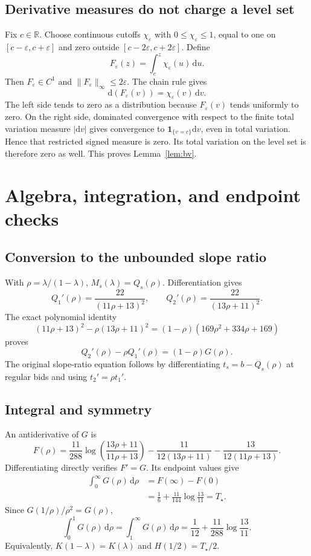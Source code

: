 \documentclass[11pt,a4paper]{article}
\numberwithin{equation}{section}
\theoremstyle{definition}
\theoremstyle{remark}
\newcommand{\R}{\mathbb R}
\newcommand{\dd}{\,\mathrm d}
\newcommand{\ind}{\mathbf 1}
\newcommand{\Ts}{T_\star}
\begin{document}
\subsection{Derivative measures do not charge a level set}
Fix $c\in\R$. Choose continuous cutoffs $\chi_\varepsilon$ with $0\le\chi_\varepsilon\le1$, equal to one on $[c-\varepsilon,c+\varepsilon]$ and zero outside $[c-2\varepsilon,c+2\varepsilon]$. Define
\[
 F_\varepsilon(z)=\int_c^z\chi_\varepsilon(u)\dd u.
\]
Then $F_\varepsilon\in C^1$ and $\|F_\varepsilon\|_\infty\le2\varepsilon$. The chain rule gives
\[
 \mathrm d(F_\varepsilon(v))=\chi_\varepsilon(v)\,\mathrm dv.
\]
The left side tends to zero as a distribution because $F_\varepsilon(v)$ tends uniformly to zero. On the right side, dominated convergence with respect to the finite total variation measure $|\mathrm dv|$ gives convergence to $\ind_{\{v=c\}}\mathrm dv$, even in total variation. Hence that restricted signed measure is zero. Its total variation on the level set is therefore zero as well. This proves Lemma~\ref{lem:bv}.

\section{Algebra, integration, and endpoint checks}
\label{app:algebra}

\subsection{Conversion to the unbounded slope ratio}
With $\rho=\lambda/(1-\lambda)$, $M_s(\lambda)=Q_s(\rho)$. Differentiation gives
\[
 Q_1'(\rho)=\frac{22}{(11\rho+13)^2},\qquad
 Q_2'(\rho)=\frac{22}{(13\rho+11)^2}.
\]
The exact polynomial identity
\[
 (11\rho+13)^2-\rho(13\rho+11)^2
 =(1-\rho)(169\rho^2+334\rho+169)
\]
proves
\[
 Q_2'(\rho)-\rho Q_1'(\rho)=(1-\rho)G(\rho).
\]
The original slope-ratio equation follows by differentiating $t_s=b-Q_s(\rho)$ at regular bids and using $t_2'=\rho t_1'$.

\subsection{Integral and symmetry}
An antiderivative of $G$ is
\begin{equation}
\label{eq:antiderivative}
 F(\rho)=\frac{11}{288}\log\!\left(\frac{13\rho+11}{11\rho+13}\right)
 -\frac{11}{12(13\rho+11)}-\frac{13}{12(11\rho+13)}.
\end{equation}
Differentiating directly verifies $F'=G$. Its endpoint values give
\begin{align*}
 \int_0^\infty G(\rho)\dd\rho
 &=F(\infty)-F(0)\\
 &=\frac16+\frac{11}{144}\log\!\frac{13}{11}=\Ts.
\end{align*}
Since $G(1/\rho)/\rho^2=G(\rho)$,
\[
 \int_0^1G(\rho)\dd\rho
 =\int_1^\infty G(\rho)\dd\rho
 =\frac1{12}+\frac{11}{288}\log\!\frac{13}{11}.
\]
Equivalently, $K(1-\lambda)=K(\lambda)$ and $H(1/2)=\Ts/2$.
\end{document}
